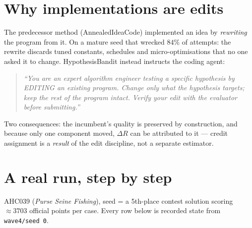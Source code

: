 \documentclass[11pt]{article}
\begin{document}
\section{Why implementations are edits}

The predecessor method (AnnealedIdeaCode) implemented an idea by \emph{rewriting} the program from
it. On a mature seed that wrecked $84\%$ of attempts: the rewrite discards tuned constants,
schedules and micro-optimisations that no one asked it to change. HypothesisBandit instead
instructs the coding agent:

\begin{quote}\itshape
``You are an expert algorithm engineer testing a specific hypothesis by EDITING an existing
program. Change only what the hypothesis targets; keep the rest of the program intact. Verify your
edit with the evaluator before submitting.''
\end{quote}

\noindent Two consequences: the incumbent's quality is preserved by construction, and because only
one component moved, $\Delta R$ can be attributed to it --- credit assignment is a \emph{result}
of the edit discipline, not a separate estimator.

\section{A real run, step by step}

AHC039 (\emph{Purse Seine Fishing}), seed = a 5th-place contest solution scoring $\approx 3703$
official points per case. Every row below is recorded state from \texttt{wave4/seed 0}.
\end{document}
